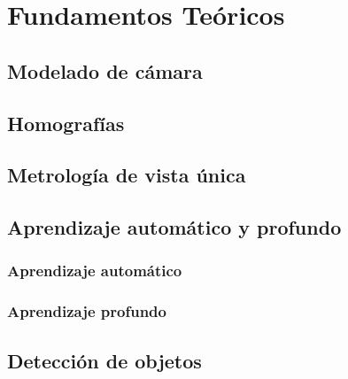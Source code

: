 \chapter{Fundamentos Teóricos}
\section{Modelado de cámara}
\section{Homografías}
\section{Metrología de vista única}
\section{Aprendizaje automático y profundo}
\subsection{Aprendizaje automático}
\subsection{Aprendizaje profundo}
\section{Detección de objetos}
